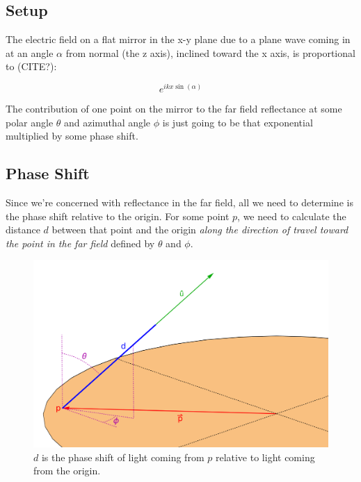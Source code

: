 \documentclass[etd,twoside,senior]{BYUPhys}
\begin{document}
\subsection{Setup} \label{sec:setup}

The electric field on a flat mirror in the x-y plane due to a plane wave coming in at an angle $\alpha$ from normal (the z axis), inclined toward the x axis, is proportional to (CITE?):

\begin{equation}
  e^{ikx\sin\left({\alpha}\right)}
\end{equation}

The contribution of one point on the mirror to the far field reflectance at some polar angle $\theta$ and azimuthal angle $\phi$ is just going to be that exponential multiplied by some phase shift.

\subsection{Phase Shift} \label{sec:phase_shift}
Since we're concerned with reflectance in the far field, all we need to determine is the phase shift relative to the origin. For some point $p$, we need to calculate the distance $d$ between that point and the origin \textit{along the direction of travel toward the point in the far field} defined by $\theta$ and $\phi$.

\begin{figure}
  \centerline{\includegraphics[width=\textwidth]{phase-length}}
  \caption[Phase length of a beam of light]{\label{fig:phase_length}
    $d$ is the phase shift of light coming from $p$ relative to light coming from the origin.}
\end{figure}
\end{document}
